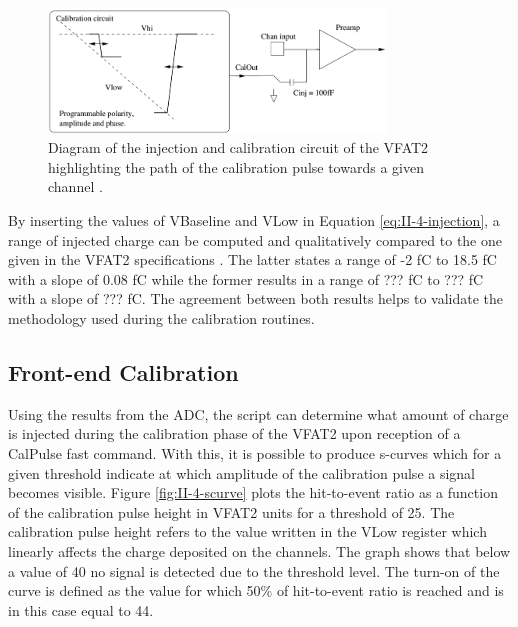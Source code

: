       \begin{figure}[h!]
        \centering
        \includegraphics[width=0.8\textwidth]{img/II-4-qualification/injection.png}
        \caption{Diagram of the injection and calibration circuit of the VFAT2 highlighting the path of the calibration pulse towards a given channel \cite{Aspell:1267947}.}
        \label{fig:II-4-injection}
      \end{figure}

      By inserting the values of VBaseline and VLow in Equation \ref{eq:II-4-injection}, a range of injected charge can be computed and qualitatively compared to the one given in the VFAT2 specifications \cite{Aspell:1267947}. The latter states a range of -2 fC to 18.5 fC with a slope of 0.08 fC while the former results in a range of ??? fC to ??? fC with a slope of ??? fC. The agreement between both results helps to validate the methodology used during the calibration routines.


    \subsection{Front-end Calibration}

      Using the results from the ADC, the script can determine what amount of charge is injected during the calibration phase of the VFAT2 upon reception of a CalPulse fast command. With this, it is possible to produce s-curves which for a given threshold indicate at which amplitude of the calibration pulse a signal becomes visible. Figure \ref{fig:II-4-scurve} plots the hit-to-event ratio as a function of the calibration pulse height in VFAT2 units for a threshold of 25. The calibration pulse height refers to the value written in the VLow register which linearly affects the charge deposited on the channels. The graph shows that below a value of 40 no signal is detected due to the threshold level. The turn-on of the curve is defined as the value for which 50\% of hit-to-event ratio is reached and is in this case equal to 44. \\


